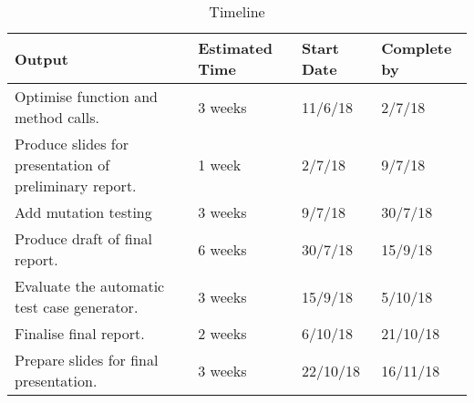 \begin{table}[H]
	  \centering
\begin{tabular}{ |p{10cm}|p{2cm}|p{2cm}|p{2cm}| }
\hline
\textbf{Output} & \textbf{Estimated Time} & \textbf{Start Date} & \textbf{Complete by}\\
\hline
Optimise function and method calls. & 3 weeks & 11/6/18 & 2/7/18 \\
\hline
Produce slides for presentation of preliminary report. & 1 week & 2/7/18 & 9/7/18\\
\hline
Add mutation testing & 3 weeks & 9/7/18 & 30/7/18 \\
\hline
Produce draft of final report. & 6 weeks & 30/7/18 & 15/9/18\\
\hline
Evaluate the automatic test case generator. & 3 weeks & 15/9/18 & 5/10/18 \\
\hline
Finalise final report. & 2 weeks & 6/10/18 & 21/10/18\\
\hline
Prepare slides for final presentation. & 3 weeks & 22/10/18 & 16/11/18\\
\hline
\end{tabular}

\caption{Timeline}
\label{table:timeline}

\end{table}

